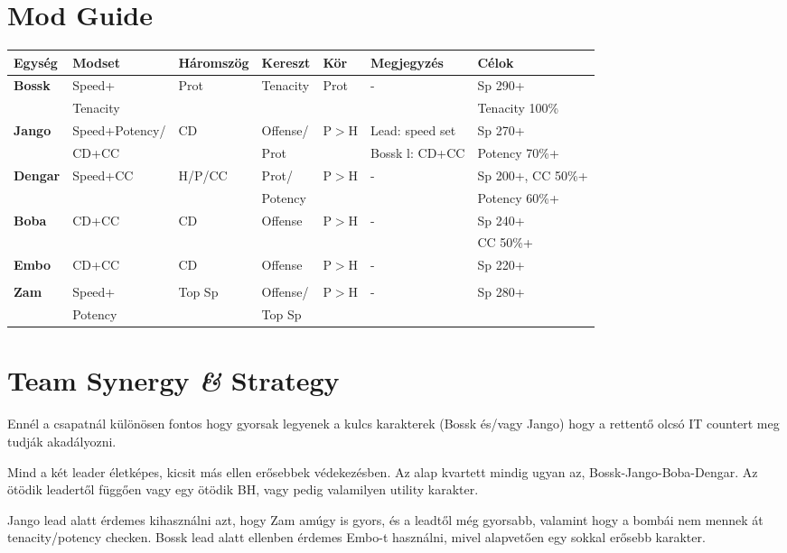 \documentclass[11pt]{report}
\begin{document}
\section{Mod Guide}
    \begin{center}
    \begin{tabular}{|l | l | l | l | l | l | l |}
        \hline
        Egység & Modset & Háromszög & Kereszt & Kör & Megjegyzés & Célok\\ \hline
        \textbf{Bossk} & Speed+ & Prot & Tenacity & Prot & - & Sp 290+\\
        & Tenacity &  &  &  &  & Tenacity 100\%\\ \hline
        \textbf{Jango} & Speed+Potency/ & CD & Offense/ & P$>$H & Lead: speed set & Sp   270+\\
        & CD+CC &  & Prot &  & Bossk l: CD+CC & Potency 70\%+\\ \hline
        \textbf{Dengar} & Speed+CC & H/P/CC & Prot/ & P$>$H & - & Sp 200+, CC 50\%+\\
        &  &  & Potency &  &  & Potency 60\%+\\ \hline
        \textbf{Boba} & CD+CC & CD & Offense & P$>$H & -  & Sp 240+\\
        &  &  &  &  &  & CC 50\%+\\ \hline
        \textbf{Embo} & CD+CC & CD & Offense & P$>$H & - & Sp 220+\\
        &  &  &  &  &  & \\ \hline
        \textbf{Zam} & Speed+ & Top Sp & Offense/ & P$>$H & - & Sp 280+\\
        & Potency &  & Top Sp &  &  & \\ \hline
        
    \end{tabular}
\end{center}
\section{Team Synergy \textit{\&} Strategy}
Ennél a csapatnál különösen fontos hogy gyorsak legyenek a kulcs karakterek (Bossk és/vagy Jango) hogy a rettentő olcsó IT countert meg tudják akadályozni.\par
Mind a két leader életképes, kicsit más ellen erősebbek védekezésben. Az alap kvartett mindig ugyan az, Bossk-Jango-Boba-Dengar. Az ötödik leadertől függően vagy egy ötödik BH, vagy pedig valamilyen utility karakter.\par
Jango lead alatt érdemes kihasználni azt, hogy Zam amúgy is gyors, és a leadtől még gyorsabb, valamint hogy a bombái nem mennek át tenacity/potency checken. Bossk lead alatt ellenben érdemes Embo-t használni, mivel alapvetően egy sokkal erősebb karakter.
\end{document}
